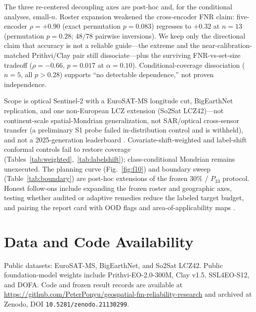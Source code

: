 \documentclass[journal]{IEEEtran}
\renewcommand{\_}{\textunderscore\allowbreak}
\begin{document}
The three re-centered decoupling axes are post-hoc and, for the conditional analyses, small-$n$.
Roster expansion weakened the cross-encoder FNR claim: five-encoder $\rho{=}+0.90$ (exact permutation
$p{=}0.083$) regresses to $+0.32$ at $n{=}13$ (permutation $p{=}0.28$; $48/78$ pairwise inversions). We
keep only the directional claim that accuracy is not a reliable guide---the extreme and the
near-calibration-matched Prithvi/Clay pair still dissociate---plus the surviving FNR-vs-set-size
tradeoff ($\rho{=}-0.66$, $p{=}0.017$ at $\alpha{=}0.10$). Conditional-coverage dissociation ($n{=}5$,
all $p>0.28$) supports ``no detectable dependence,'' not proven independence.

Scope is optical Sentinel-2 with a EuroSAT-MS longitude cut, BigEarthNet replication, and one
non-European LCZ extension (So2Sat LCZ42)---not continent-scale spatial-Mondrian generalization,
not SAR/optical cross-sensor transfer (a preliminary S1 probe failed in-distribution control and is
withheld), and not a 2025-generation leaderboard \citep{tseng2025galileo,danish2025terrafm}.
Covariate-shift-weighted and label-shift conformal controls fail to restore coverage
(Tables~\ref{tab:weighted},~\ref{tab:labelshift}); class-conditional Mondrian remains unexecuted. The
planning curve (Fig.~\ref{fig:f10}) and boundary sweep (Table~\ref{tab:boundary}) are post-hoc
extensions of the frozen $30\%$ / $P_{33}$ protocol. Honest follow-ons include expanding the frozen
roster and geographic axes, testing whether audited or adaptive remedies
\citep{zhou2026acp,gibbs2021adaptive,gibbs2024online} reduce the labeled target budget, and pairing
the report card with OOD flags and area-of-applicability maps
\citep{cohrs2025shrugfm,meyer2021aoa,tamazyan2025geocrossbench}.

\section*{Data and Code Availability}
Public datasets: EuroSAT-MS, BigEarthNet, and So2Sat LCZ42. Public foundation-model weights
include Prithvi-EO-2.0-300M, Clay v1.5, SSL4EO-S12, and DOFA.
Code and frozen result records are available at
\url{https://github.com/PeterPonyu/geospatial-fm-reliability-research}
and archived at Zenodo, DOI \texttt{10.5281/zenodo.21130299}.

\FloatBarrier


\end{document}
